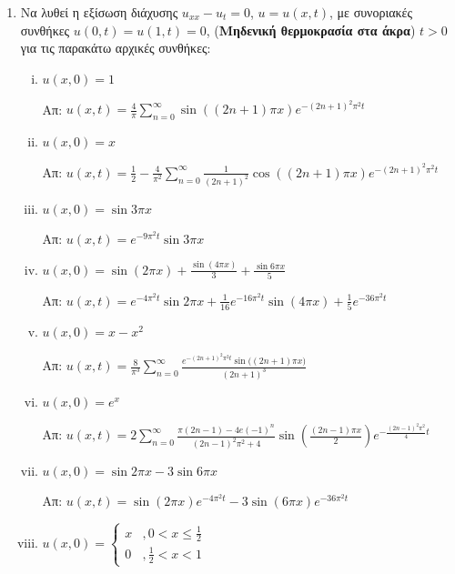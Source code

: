 \documentclass[a4paper,table]{report}
\begin{document}
\begin{enumerate}

	\item Να λυθεί η εξίσωση διάχυσης $ u_{xx} - u_t = 0 $, $ u=u(x,t) $, με συνοριακές συνθήκες $
		u(0,t) = u(1,t) = 0 $, ({\bfseries Μηδενική θερμοκρασία στα άκρα}) $ t>0 $ για τις παρακάτω αρχικές συνθήκες:

		\begin{enumerate}[(i)]
			\item $u(x,0) = 1$

				\hfill Απ: $ u(x,t) = \frac{ 4 }{ \pi } \sum_{n=0}^{\infty} \sin{((2n+1)\pi x)}
				e^{-(2n+1)^{2}\pi^{2}t} $

			\item $ u(x,0) = x $

				\hfill Απ: $ u(x,t) = \frac{1}{ 2 } - \frac{ 4 }{ \pi^{2} } \sum_{n=0}^{\infty}
				\frac{1}{ (2n+1)^{2} } \cos{((2n+1)\pi x)}e^{-(2n+1)^{2}\pi^{2}t } $

			\item $ u(x,0) = \sin{3\pi x} $

				\hfill Απ: $ u(x,t) = e^{-9\pi^{2}t} \sin{3\pi x}  $

			\item $ u(x,0) = \sin{(2\pi x)} + \frac{ \sin{(4\pi x)}  }{ 3 } + \frac{ \sin{6\pi x}
				 }{ 5 } $

				 \hfill Απ: $ u(x,t) = e^{-4\pi^{2}t} \sin{2\pi x} + \frac{1}{ 16 }
				 e^{-16\pi^{2}t}\sin (4\pi x) + \frac{1}{ 5 } e^{-36\pi^{2}t} $
				 
			 \item $ u(x,0) = x-x^{2} $ 

				 \hfill Απ: $ u(x,t) = \frac{ 8 }{ \pi^{3} } \sum_{n=0}^{\infty} \frac{
				 e^{-(2n+1)^{2}\pi^{2}t} \sin{((2n+1)}\pi x) }{ (2n+1)^{3} }  $

		\item $ u(x,0) = e^{x} $

			\hfill Απ: $ u(x,t) = 2 \sum_{n=0}^{\infty} \frac{ \pi(2n-1)-4e(-1)^{n}
			}{(2n-1)^{2}\pi^{2} +4  } \sin{\left(\frac{ (2n-1)\pi x }{ 2 }\right)}
				e^{-\frac{(2n-1)^{2}\pi^{2}}{4}t}  $

			\item $ u(x,0) = \sin{2\pi x} - 3 \sin{6\pi x} $

				\hfill Απ: $ u(x,t) = \sin{(2\pi x)} e^{-4\pi^{2}t} - 3 \sin{(6\pi x)}
				e^{-36\pi^{2}t }  $

			\item $ u(x,0) = \begin{cases}
					x &, 0<x\leq \frac{ 1 }{ 2 } \\
					0 &, \frac{1}{ 2 } <x<1
			\end{cases}$ 
			

\end{enumerate}
\end{enumerate}
\end{document}
